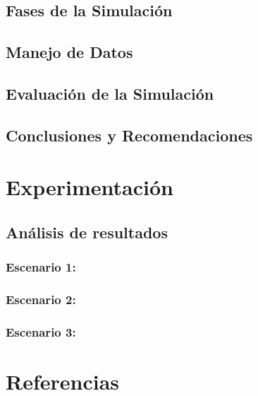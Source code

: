 \documentclass{article}
\begin{document}
\subsection{Fases de la Simulación}


\subsection{Manejo de Datos}

\subsection{Evaluación de la Simulación}


\subsection{Conclusiones y Recomendaciones}



\section{Experimentación}\label{sec:exp}

\subsection{Análisis de resultados}

\subsubsection{Escenario 1: }

\subsubsection{Escenario 2: }
 
\subsubsection{Escenario 3: }



\section{Referencias}
\renewcommand{\refname}{}
\end{document}
